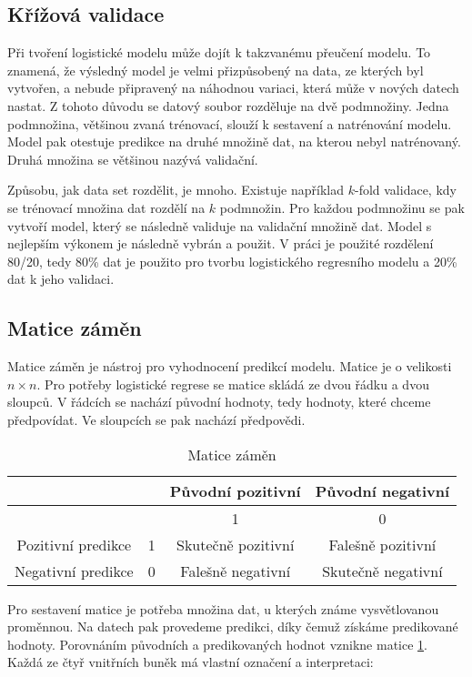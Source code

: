 {\color{red}
\subsection{Křížová validace}
Při tvoření logistické modelu může dojít k takzvanému přeučení modelu. To znamená, že výsledný model je velmi přizpůsobený na data, ze kterých byl vytvořen, a nebude
připravený na náhodnou variaci, která může v nových datech nastat. Z tohoto důvodu se datový soubor rozděluje na dvě podmnožiny. Jedna podmnožina, většinou zvaná trénovací,
slouží k sestavení a natrénování modelu. Model pak otestuje predikce na druhé množině dat, na kterou nebyl natrénovaný. Druhá množina se většinou nazývá validační. 

Způsobu, jak data set rozdělit, je mnoho. Existuje například $k$-fold validace, kdy se trénovací množina dat rozdělí na $k$ podmnožin. Pro každou podmnožinu se pak vytvoří
model, který se následně validuje na validační množině dat. Model s nejlepším výkonem je následně vybrán a použit. V práci je použité rozdělení 80/20, tedy 80\% dat je použito
pro tvorbu logistického regresního modelu a 20\% dat k jeho validaci.
}

\subsection{Matice záměn}
Matice záměn je nástroj pro vyhodnocení predikcí modelu. Matice je o velikosti $n \times n$. Pro potřeby logistické regrese se matice skládá ze dvou řádku a dvou sloupců.
V řádcích se nachází původní hodnoty, tedy hodnoty, které chceme předpovídat. Ve sloupcích se pak nachází předpovědi.  

\begin{table}[H]
    \centering
    \begin{tabular}{|c|c|c|c|}
        \hline
                           &   & Původní pozitivní   & Původní negativní    \\ \hline
                           &   & 1                  & 0                  \\ \hline
        Pozitivní predikce & 1 & Skutečně pozitivní & Falešně pozitivní  \\ \hline
        Negativní predikce & 0 & Falešně negativní  & Skutečně negativní \\ \hline
    \end{tabular}
    \caption{\label{tab:matice_zamen}Matice záměn}
\end{table}

Pro sestavení matice je potřeba množina dat, u kterých známe vysvětlovanou proměnnou. Na datech pak provedeme predikci, díky čemuž získáme predikované hodnoty. Porovnáním
původních a predikovaných hodnot vznikne matice \ref{tab:matice_zamen}. Každá ze čtyř vnitřních buněk má vlastní označení a interpretaci:

